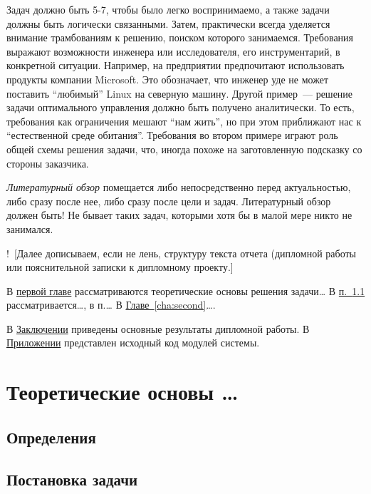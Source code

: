 \documentclass[a4paper,14pt, openany, twoside, draft]{extbook} %
\newcommand{\nnn}[2][ncolor]{\noindent%
\textcolor{eclr}{!\ [}\textcolor{#1}{#2}\textcolor{eclr}{]}}
\begin{document}
Задач должно быть 5-7, чтобы было легко воспринимаемо, а также задачи должны быть логически связанными.  Затем, практически всегда уделяется внимание трамбованиям к решению, поиском которого занимаемся.  Требования выражают возможности инженера или исследователя, его инструментарий, в конкретной ситуации.  Например, на предприятии предпочитают использовать продукты компании Microsoft.  Это обозначает, что инженер уде не может поставить ``любимый'' Linux на северную машину.  Другой пример~--- решение задачи оптимального управления должно быть получено аналитически.  То есть, требования как ограничения мешают ``нам жить'', но при этом приближают нас к ``естественной среде обитания''.  Требования во втором примере играют роль общей схемы решения задачи, что, иногда похоже на заготовленную подсказку со стороны заказчика.

\emph{Литературный обзор} помещается либо непосредственно перед актуальностью, либо сразу после нее, либо сразу после цели и задач.  Литературный обзор должен быть!  Не бывает таких задач, которыми хотя бы в малой мере никто не занимался.

\nnn{Далее дописываем, если не лень, структуру текста отчета (дипломной работы или пояснительной записки к дипломному проекту.}

В \hyperref[cha:first]{первой главе} рассматриваются теоретические основы решения задачи\ldots{} В \hyperref[sec:first:one]{п.~\ref{sec:first:one}} рассматривается\ldots{}, в п.\ldots{}  В \hyperref[cha:second]{Главе~\ref{cha:second}}\ldots.

В \hyperref[cha:conc]{Заключении} приведены основные результаты дипломной работы.  В \hyperref[cha:app]{Приложении} представлен исходный код модулей системы.



\chapter{Теоретические основы \ldots{}}
\label{cha:first}

\section{Определения}
\label{sec:first:one}

\section{Постановка задачи }
\end{document}
